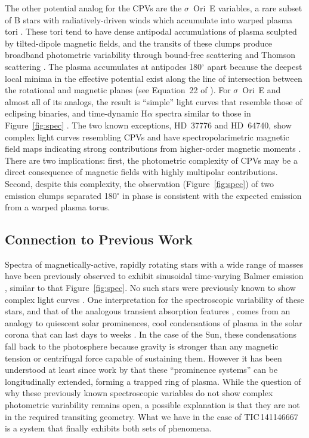 \documentclass[11pt,twocolumn,tighten,linenumbers]{aastex7}
\begin{document}
The other potential analog for the CPVs are the $\sigma$~Ori~E
variables, a rare subset of B stars with radiatively-driven winds
which accumulate into warped plasma tori
\citep{Townsend2005,Townsend2008}.  These tori tend to have dense
antipodal accumulations of plasma sculpted by tilted-dipole magnetic
fields, and the transits of these clumps produce broadband photometric
variability through bound-free scattering \citep{Townsend2005} and
Thomson scattering \citep{Berry2022}.  The plasma accumulates at
antipodes 180$^\circ$ apart because the deepest local minima in the
effective potential exist along the line of intersection between the
rotational and magnetic planes (see Equation~22 of
\citealt{Townsend2005}).  For $\sigma$~Ori~E and almost all of its
analogs, the result is ``simple'' light curves that resemble those of
eclipsing binaries, and time-dynamic H$\alpha$ spectra similar to
those in Figure~\ref{fig:spec} \citep{Townsend2005,Townsend2008}.  The
two known exceptions, HD~37776 and HD~64740, show complex light curves
resembling CPVs \citep{Mikulasek2020,Bouma2024} and have
spectropolarimetric magnetic field maps indicating strong
contributions from higher-order magnetic moments
\citep{Kochukhov2011,Shultz2018}.  There are two implications: first,
the photometric complexity of CPVs may be a direct consequence of
magnetic fields with highly multipolar contributions.  Second, despite
this complexity, the observation (Figure~\ref{fig:spec}) of two
emission clumps separated 180$^\circ$ in phase is consistent with the
expected emission from a warped plasma torus.


\subsection{Connection to Previous Work}

Spectra of magnetically-active, rapidly rotating stars with a wide
range of masses have been previously observed to exhibit 
sinusoidal time-varying Balmer emission
\citep{Donati2000,Townsend2005,Dunstone2006,Skelly2008}, similar to
that Figure~\ref{fig:spec}.  No such stars were previously known to show
complex light curves \citep{Bouma2024}.   One interpretation for the
spectroscopic variability of these stars, and that of the analogous transient
absorption features
\citep{CollierCameron1989,CollierCameron1992,Cang2020}, comes from an
analogy to quiescent solar prominences, cool condensations of plasma
in the solar corona that can last days to weeks
\citep{VialEngvold2015}.  In the case of the Sun, these condensations
fall back to the photosphere because gravity is stronger than any
magnetic tension or centrifugal force capable of sustaining them.  
However it has been understood at least since work by
\citet{Donati2000} that these ``prominence systems'' can be
longitudinally extended, forming a trapped ring of plasma.
While the question of why these previously known spectroscopic
variables do not show complex photometric variability remains open,
a possible explanation is that they are not in the required transiting
geometry.
What we have in the case of TIC\,141146667 is a system that finally
exhibits both sets of phenomena.
\end{document}
